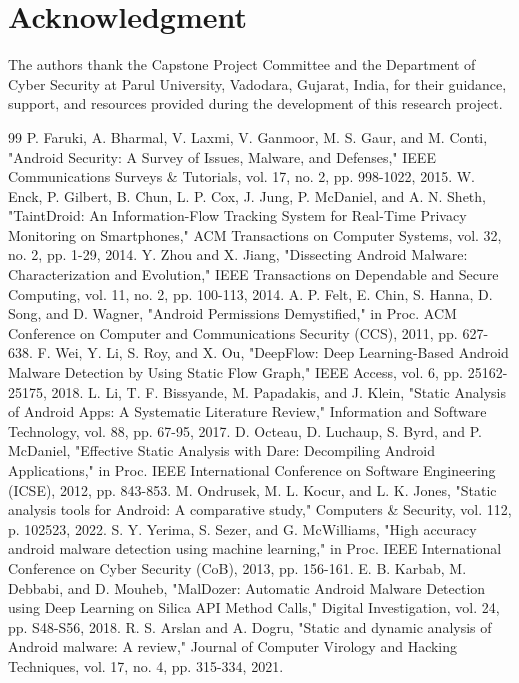 \documentclass[conference]{
IEEEtran}
\begin{document}
\section*{Acknowledgment}
The authors thank the Capstone Project Committee and the Department of Cyber Security at Parul University, Vadodara, Gujarat, India, for their guidance, support, and resources provided during the development of this research project.

\begin{thebibliography}{99}
 P. Faruki, A. Bharmal, V. Laxmi, V. Ganmoor, M. S. Gaur, and M. Conti, "Android Security: A Survey of Issues, Malware, and Defenses," IEEE Communications Surveys & Tutorials, vol. 17, no. 2, pp. 998-1022, 2015.
 W. Enck, P. Gilbert, B. Chun, L. P. Cox, J. Jung, P. McDaniel, and A. N. Sheth, "TaintDroid: An Information-Flow Tracking System for Real-Time Privacy Monitoring on Smartphones," ACM Transactions on Computer Systems, vol. 32, no. 2, pp. 1-29, 2014.
 Y. Zhou and X. Jiang, "Dissecting Android Malware: Characterization and Evolution," IEEE Transactions on Dependable and Secure Computing, vol. 11, no. 2, pp. 100-113, 2014.
 A. P. Felt, E. Chin, S. Hanna, D. Song, and D. Wagner, "Android Permissions Demystified," in Proc. ACM Conference on Computer and Communications Security (CCS), 2011, pp. 627-638.
 F. Wei, Y. Li, S. Roy, and X. Ou, "DeepFlow: Deep Learning-Based Android Malware Detection by Using Static Flow Graph," IEEE Access, vol. 6, pp. 25162-25175, 2018.
 L. Li, T. F. Bissyande, M. Papadakis, and J. Klein, "Static Analysis of Android Apps: A Systematic Literature Review," Information and Software Technology, vol. 88, pp. 67-95, 2017.
 D. Octeau, D. Luchaup, S. Byrd, and P. McDaniel, "Effective Static Analysis with Dare: Decompiling Android Applications," in Proc. IEEE International Conference on Software Engineering (ICSE), 2012, pp. 843-853.
 M. Ondrusek, M. L. Kocur, and L. K. Jones, "Static analysis tools for Android: A comparative study," Computers & Security, vol. 112, p. 102523, 2022.
 S. Y. Yerima, S. Sezer, and G. McWilliams, "High accuracy android malware detection using machine learning," in Proc. IEEE International Conference on Cyber Security (CoB), 2013, pp. 156-161.
 E. B. Karbab, M. Debbabi, and D. Mouheb, "MalDozer: Automatic Android Malware Detection using Deep Learning on Silica API Method Calls," Digital Investigation, vol. 24, pp. S48-S56, 2018.
 R. S. Arslan and A. Dogru, "Static and dynamic analysis of Android malware: A review," Journal of Computer Virology and Hacking Techniques, vol. 17, no. 4, pp. 315-334, 2021.

\end{thebibliography}
\end{document}

